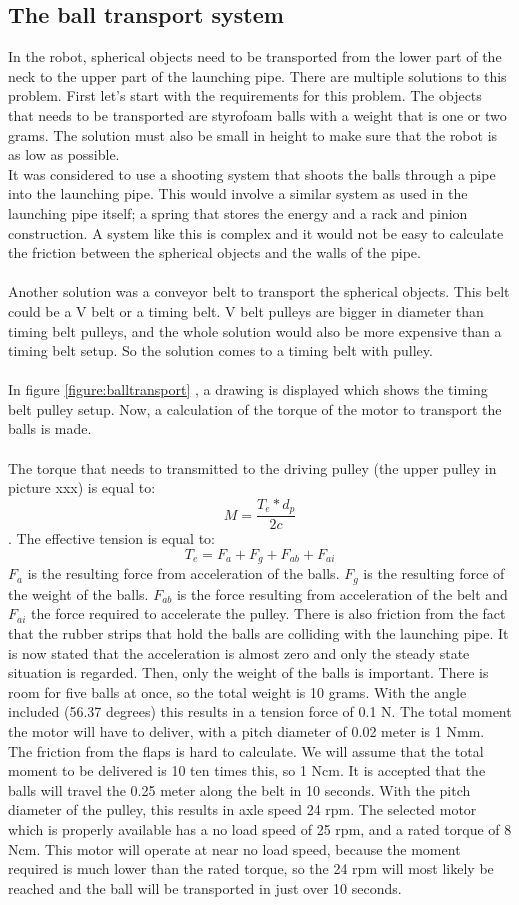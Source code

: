\documentclass[11pt,twoside,a4paper]{report}
\begin{document}
\subsection{The ball transport system}
In the robot, spherical objects need to be transported from the lower part of the neck to the upper part of the launching pipe. There are multiple solutions to this problem. First let\rq{}s start with the requirements for this problem. The objects that needs to be transported are styrofoam balls with a weight that is one or two grams. The solution must also be small in height to make sure that the robot is as low as possible.  \\
It was considered to use a shooting system that shoots the balls through a pipe into the launching pipe. This would involve a similar system as used in the launching pipe itself; a spring that stores the energy and a rack and pinion construction. A system like this is complex and it would not be easy to calculate the friction between the spherical objects and the walls of the pipe.\\
\\
Another solution was a conveyor belt to transport the spherical objects. This belt could be a V belt or a timing belt. V belt pulleys are bigger in diameter than timing belt pulleys, and the whole solution would also be more expensive than a timing belt setup. So the solution comes to a timing belt with pulley.\\
\\
In figure \ref{figure:balltransport} , a drawing is displayed which shows the timing belt pulley setup. Now, a calculation of the torque of the motor to transport the balls is made.\\
\\The torque that needs to transmitted to the driving pulley (the upper pulley in picture xxx) is equal to: \[M=\frac{T_{e}*d_{p}}{2c}  \].
The effective tension is equal to:
\[T_{e}=F_{a}+F_{g}+F_{ab}+F_{ai}  \]
$F_{a}$ is the resulting force from acceleration of the balls. $F_{g}$ is the resulting force of the weight of the balls. $F_{ab}$ is the force resulting from acceleration of the belt and $F_{­ai}$ the force required to accelerate the pulley.  There is also friction from the fact that the rubber strips that hold the balls are colliding with the launching pipe. It is now stated that the acceleration is almost zero and only the steady state situation is regarded. Then, only the weight of the balls is important. There is room for five balls at once, so the total weight is 10 grams. With the angle included (56.37 degrees) this results in a tension force of 0.1 N. The total moment the motor will have to deliver, with a pitch diameter of 0.02 meter is 1 Nmm. The friction from the flaps is hard to calculate. We will assume that the total moment to be delivered is 10 ten times this, so 1 Ncm. It is accepted that the balls will travel the 0.25 meter along the belt in 10 seconds. With the pitch diameter of the pulley, this results in axle speed 24 rpm. The selected motor which is properly available has a no load speed of 25 rpm, and a rated torque of 8 Ncm. This motor will operate at near no load speed, because the moment required is much lower than the rated torque, so the 24 rpm will most likely be reached and the ball will be transported in just over 10 seconds. 
\end{document}
